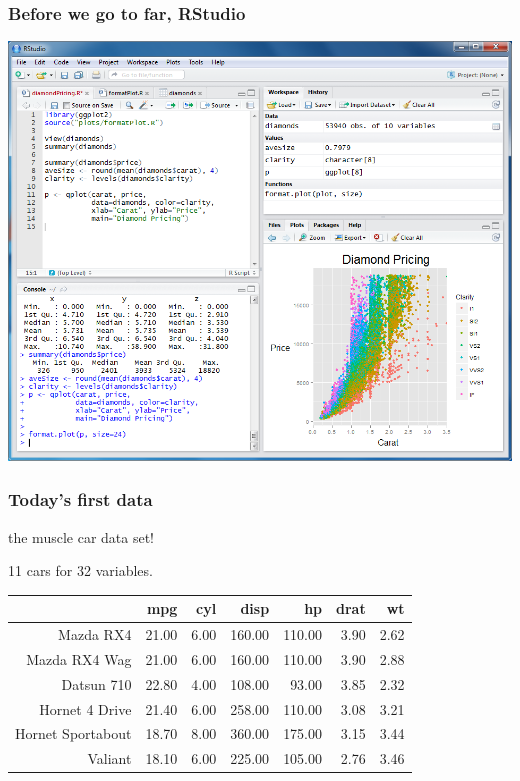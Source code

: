 \documentclass{beamer}\usepackage{graphicx, color}
\begin{document}
\begin{frame}
  \frametitle{Before we go to far, RStudio}
  \includegraphics[height = \textheight, keepaspectratio = true]{figure/rstudio}

\end{frame}

\begin{frame}
  \frametitle{Today's first data}

  the muscle car data set!

  11 cars for 32 variables.

\begin{table}[ht]
\begin{center}
\begin{tabular}{rrrrrrr}
  \hline
 & mpg & cyl & disp & hp & drat & wt \\ 
  \hline
Mazda RX4 & 21.00 & 6.00 & 160.00 & 110.00 & 3.90 & 2.62 \\ 
  Mazda RX4 Wag & 21.00 & 6.00 & 160.00 & 110.00 & 3.90 & 2.88 \\ 
  Datsun 710 & 22.80 & 4.00 & 108.00 & 93.00 & 3.85 & 2.32 \\ 
  Hornet 4 Drive & 21.40 & 6.00 & 258.00 & 110.00 & 3.08 & 3.21 \\ 
  Hornet Sportabout & 18.70 & 8.00 & 360.00 & 175.00 & 3.15 & 3.44 \\ 
  Valiant & 18.10 & 6.00 & 225.00 & 105.00 & 2.76 & 3.46 \\ 
   \hline
\end{tabular}
\end{center}
\end{table}



\end{frame}
\end{document}
